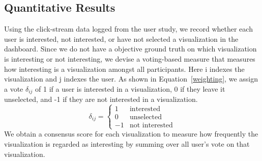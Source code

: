 \subsection{Quantitative Results}
 Using the click-stream data logged from the user study, we record whether each user is interested, not interested, or have not selected a visualization in the dashboard. %
Since we do not have a objective ground truth on which visualization is interesting or not interesting, we devise a voting-based measure that measures how interesting is a visualization amongst all participants. Here i indexes the visualization and j indexes the user. As shown in Equation~\ref{weighting}, we assign a vote $\delta_{ij}$ of 1 if a user is interested in a visualization, 0 if they leave it unselected, and -1 if they are not interested in a visualization.
\begin{equation}\label{weighting}
	\delta_{ij}= \left\{\begin{matrix}
	 1& \textrm{interested}
	\\ 0 & \textrm{unselected}
	\\ -1 & \textrm{not interested}
	\end{matrix}\right.
\end{equation}
We obtain a consensus score for each visualization to measure how frequently the visualization is regarded as interesting by summing over all user's vote on that visualization.
